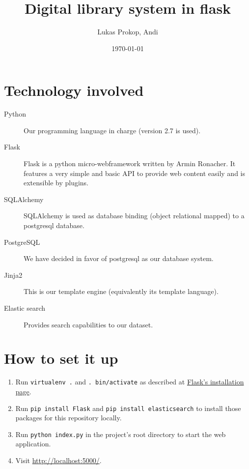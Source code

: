 \documentclass{article}
\author{
    Lukas Prokop,
    Andi
}
\title{Digital library system in flask}
\date{\today}
\begin{document}
\maketitle
\tableofcontents

\section{Technology involved}
%
\begin{description}
  \item[Python]
    Our programming language in charge (version 2.7 is used).
  \item[Flask]
    Flask is a python micro-webframework written by Armin Ronacher.
    It features a very simple and basic API to provide web content easily
    and is extensible by plugins.
  \item[SQLAlchemy]
    SQLAlchemy is used as database binding (object relational mapped)
    to a postgresql database.
  \item[PostgreSQL]
    We have decided in favor of postgresql as our database system.
  \item[Jinja2]
    This is our template engine (equivalently its template language).
  \item[Elastic search]
    Provides search capabilities to our dataset.
\end{description}

\section{How to set it up}
%
\begin{enumerate}
  \item Run \texttt{virtualenv .} and \texttt{. bin/activate}
        as described at \href{http://flask.pocoo.org/docs/installation/#installation}%
        {Flask's installation page}.
  \item Run \texttt{pip install Flask} and \texttt{pip install elasticsearch}
        to install those packages for this repository locally.
  \item Run \texttt{python index.py} in the project's root directory to start the web application.
  \item Visit \url{http://localhost:5000/}.
\end{enumerate}
\end{document}
